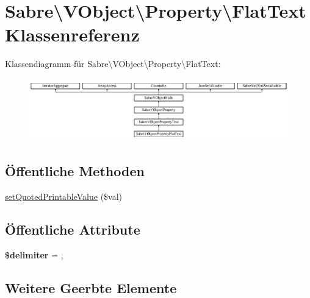 \hypertarget{class_sabre_1_1_v_object_1_1_property_1_1_flat_text}{}\section{Sabre\textbackslash{}V\+Object\textbackslash{}Property\textbackslash{}Flat\+Text Klassenreferenz}
\label{class_sabre_1_1_v_object_1_1_property_1_1_flat_text}
Klassendiagramm für Sabre\textbackslash{}V\+Object\textbackslash{}Property\textbackslash{}Flat\+Text\+:\begin{figure}[H]
\begin{center}
\leavevmode
\includegraphics[height=2.731707cm]{class_sabre_1_1_v_object_1_1_property_1_1_flat_text}
\end{center}
\end{figure}
\subsection*{Öffentliche Methoden}
\begin{DoxyCompactItemize}
\item 
\mbox{\hyperlink{class_sabre_1_1_v_object_1_1_property_1_1_flat_text_acb5942fc9d114d68013b6a15303d5967}{set\+Quoted\+Printable\+Value}} (\$val)
\end{DoxyCompactItemize}
\subsection*{Öffentliche Attribute}
\begin{DoxyCompactItemize}
\item 
\mbox{\label{class_sabre_1_1_v_object_1_1_property_1_1_flat_text_a1743f6266b50ddad610abf99c1442a11}} 
{\bfseries \$delimiter} = \textquotesingle{},\textquotesingle{}
\end{DoxyCompactItemize}
\subsection*{Weitere Geerbte Elemente}



